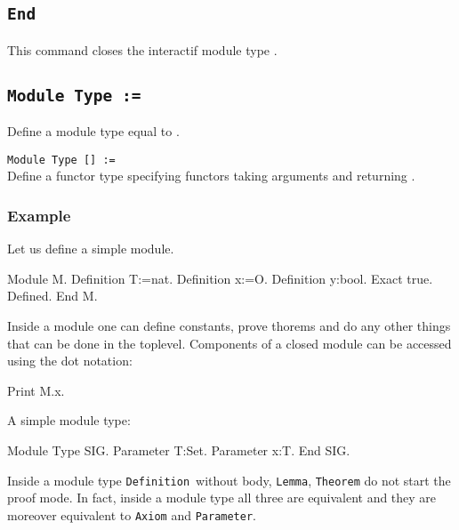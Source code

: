 \subsection{\tt End {\ident}}
This command closes the interactif module type {\ident}.

\begin{ErrMsgs}
\item {}
\end{ErrMsgs}

\subsection{\tt Module Type {\ident} := {\modtype}}
Define a module type \ident equal to \modtype.

\begin{Variants}
\item {\tt Module Type {\ident} [\modbindings] := {\modtype}} \\
  Define a functor type {\ident} specifying functors taking arguments
  {\modbindings} and returning {\modtype}.
\end{Variants}

\subsubsection{Example}

Let us define a simple module.
\begin{coq_example}
Module M.
  Definition T:=nat.
  Definition x:=O.
  Definition y:bool.
    Exact true.
  Defined.
End M.
\end{coq_example}

\noindent
Inside a module one can define constants, prove thorems and do any
other things that can be done in the toplevel. Components of a closed
module can be accessed using the dot notation:

\begin{coq_example}
Print M.x.
\end{coq_example}
A simple module type:
\begin{coq_example}
Module Type SIG.
  Parameter T:Set.
  Parameter x:T.
End SIG.
\end{coq_example}

\noindent
Inside a module type \texttt{Definition}\ without body,
\texttt{Lemma}, \texttt{Theorem} do not start the proof mode.
In fact, inside a module type all three are equivalent and they are
moreover equivalent to \texttt{Axiom} and \texttt{Parameter}.

